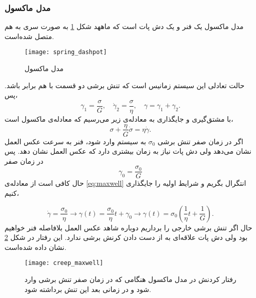 \subsubsection{مدل ماکسول}
مدل ماکسول یک فنر و یک دش پات است که ماههد شکل \ref{fig:SD} به صورت سری به هم متصل شده‌است.

\begin{figure}[htbp]
\begin{center}
\texttt{[image: spring\_dashpot]}
\caption{
مدل ماکسول
}
\label{fig:SD}
\end{center}
\end{figure}

حالت تعادلی این سیستم زمانیس است که تنش برشی دو قسمت با هم برابر باشد. پس،
\begin{equation}
\gamma_1=\frac{\sigma}{G}, \quad \dot\gamma_2=\frac{\sigma}{\eta}, \quad \gamma=\gamma_1+\gamma_2.
\end{equation}
با مشتق‌گیری و جایگذاری به معادله‌ی زیر می‌رسیم که معادله‌ی ماکسول است،
\begin{equation}
\sigma+\frac{\eta}{G}\dot\sigma=\eta\dot\gamma.
\label{eq:maxwell}
\end{equation}
اگر در زمان صفر تنش برشی $\sigma_0$ به سیستم وارد شود، فنر به سرعت عکس العمل نشان می‌دهد ولی دش پات نیاز به زمان بیشتری دارد که عکس العمل نشان دهد. پس در زمان صفر
\begin{equation}
\gamma_0=\frac{\sigma_0}{G}
\end{equation}
حال کافی‌ است از  معادله‌ی \ref{eq:maxwell}  انتگرال بگریم و شرایط اولیه را جایگذاری کنیم،

\begin{equation}
\dot\gamma=\frac{\sigma_0}{\eta}\rightarrow \gamma(t)=\frac{\sigma_0}{\eta}t+\gamma_0\rightarrow \gamma(t)=\sigma_0\left(\frac{1}{\eta}t+\frac{1}{G}\right).
\end{equation}
حال اگر تنش برشی خارجی را برداریم دوباره شاهد عکس العمل بلافاصله فنر خواهیم بود ولی دش پات علاقه‌ای به از دست دادن کرنش برشی ندارد. این رفتار در شکل \ref{fig:creep_maxwell} نشان داده شده‌است.

\begin{figure}[htbp]
\begin{center}
\texttt{[image: creep\_maxwell]}
\caption{
رفتار کردنش در مدل ماکسول هنگامی که در زمان صفر تنش برشی وارد شود و در زمانی بعد این تنش برداشته شود.
}
\label{fig:creep_maxwell}
\end{center}
\end{figure}


